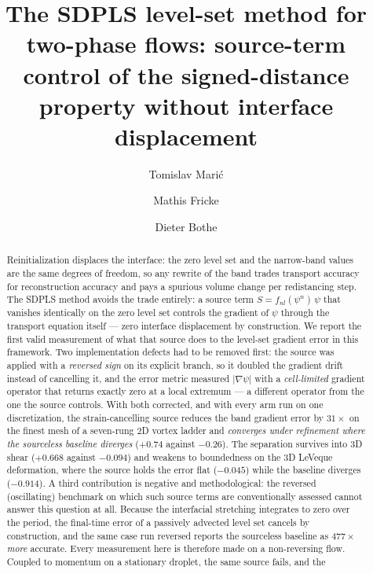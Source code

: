 \documentclass[preprint,3p,11pt]{elsarticle}
\newcommand{\psilev}{\psi}
\newcommand{\gradpsi}{\lvert\nabla\psilev\rvert}
\begin{document}
\begin{frontmatter}

\title{The SDPLS level-set method for two-phase flows: source-term control
of the signed-distance property without interface displacement}

\author[tuda]{Tomislav Mari\'{c}}
\author[tuda]{Mathis Fricke}
\author[tuda]{Dieter Bothe}
\address[tuda]{Mathematical Modeling and Analysis, TU Darmstadt, Germany}

\begin{abstract}
Reinitialization displaces the interface: the zero level set and the
narrow-band values are the same degrees of freedom, so any rewrite of the
band trades transport accuracy for reconstruction accuracy and pays a
spurious volume change per redistancing step. The SDPLS method avoids the
trade entirely: a source term $S = f_{nl}(\psilev^n)\,\psilev$ that
vanishes identically on the zero level set controls the gradient of
$\psilev$ through the transport equation itself --- zero interface
displacement by construction. We report the first valid measurement of what
that source does to the level-set gradient error in this framework. Two
implementation defects had to be removed first: the source was applied with a
\emph{reversed sign} on its explicit branch, so it doubled the gradient drift
instead of cancelling it, and the error metric measured $\gradpsi$ with a
\emph{cell-limited} gradient operator that returns exactly zero at a local
extremum --- a different operator from the one the source controls. With both
corrected, and with every arm run on one discretization, the strain-cancelling
source reduces the band gradient error by $31\times$ on the finest mesh of a
seven-rung 2D vortex ladder and \emph{converges under refinement where the
sourceless baseline diverges} ($+0.74$ against $-0.26$). The separation survives
into 3D shear ($+0.668$ against $-0.094$) and weakens to boundedness on the
3D LeVeque deformation, where the source holds the error flat ($-0.045$) while
the baseline diverges ($-0.914$). A third contribution is negative and methodological:
the reversed (oscillating) benchmark on which such source terms are
conventionally assessed cannot answer this question at all. Because the
interfacial stretching integrates to zero over the period, the final-time error
of a passively advected level set cancels by construction, and the same case
run reversed reports the sourceless baseline as $477\times$ \emph{more}
accurate. Every measurement here is therefore made on a non-reversing flow.
Coupled to momentum on a stationary droplet, the same source fails, and the

\end{abstract}
\end{frontmatter}
\end{document}
